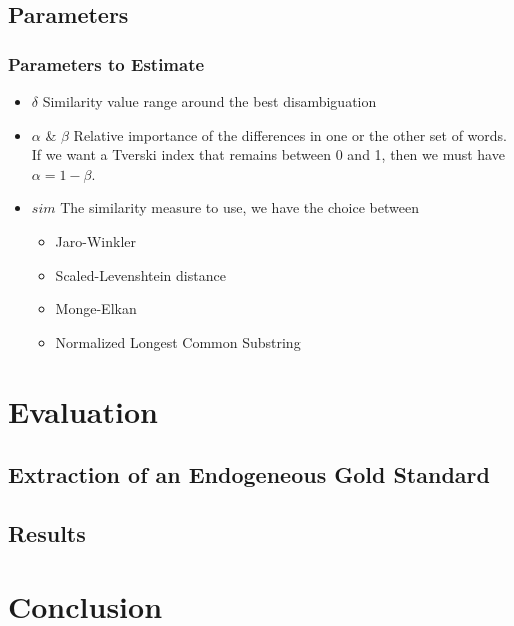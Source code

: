 \documentclass{beamer}
\begin{document}
\subsection{Parameters}
\begin{frame}
\frametitle{Parameters to Estimate}
\begin{itemize}
  \item $\delta$ Similarity value range around the best disambiguation
  \vfill
  \item $\alpha$ \& $\beta$  Relative importance of the differences in one or the other set of words. If we want a Tverski index that remains between 0 and 1, then we must have $\alpha=1-\beta$.
  \vfill
  \item $sim$ The similarity measure to use, we have the choice between
  \begin{itemize}
	  \item Jaro-Winkler
	  \item Scaled-Levenshtein distance
	  \item Monge-Elkan
	  \item Normalized Longest Common Substring
  \end{itemize}
\end{itemize}
\end{frame}

\section{Evaluation}

\subsection{Extraction of an Endogeneous Gold Standard}

\subsection{Results}

\section{Conclusion}

\end{document}
